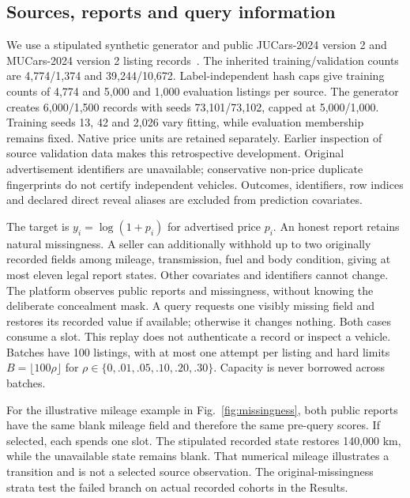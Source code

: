 \subsection{Sources, reports and query information}
\label{sec:source_query}
We use a stipulated synthetic generator and public JUCars-2024 version 2
and MUCars-2024 version 2 listing records~\cite{thalji2026jucars,tabarnoust2024mucars}.
The inherited training/validation counts are 4,774/1,374 and 39,244/10,672.
Label-independent hash caps give training counts of 4,774 and 5,000 and
1,000 evaluation listings per source. The generator creates 6,000/1,500
records with seeds 73,101/73,102, capped at 5,000/1,000. Training seeds
13, 42 and 2,026 vary fitting, while evaluation membership remains fixed.
Native price units are retained separately. Earlier inspection of source
validation data makes this retrospective development. Original advertisement
identifiers are unavailable; conservative non-price duplicate fingerprints
do not certify independent vehicles. Outcomes, identifiers, row indices and
declared direct reveal aliases are excluded from prediction covariates.

The target is $y_i=\log(1+p_i)$ for advertised price $p_i$. An honest report
retains natural missingness. A seller can additionally withhold up to two
originally recorded fields among mileage, transmission, fuel and body condition,
giving at most eleven legal report states. Other covariates and identifiers
cannot change. The platform observes public reports and missingness, without
knowing the deliberate concealment mask. A query requests one visibly missing
field and restores its recorded value if available; otherwise it changes
nothing. Both cases consume a slot. This replay does not authenticate a
record or inspect a vehicle. Batches have 100 listings, with at most one
attempt per listing and hard limits $B=\lfloor100\rho\rfloor$ for
$\rho\in\{0,.01,.05,.10,.20,.30\}$. Capacity is never borrowed across batches.

For the illustrative mileage example in Fig.~\ref{fig:missingness}, both
public reports have the same blank mileage field and therefore the same
pre-query scores. If selected, each spends one slot. The stipulated recorded
state restores 140,000 km, while the unavailable state remains blank.
That numerical mileage illustrates a transition and is not a selected source
observation. The original-missingness strata test the failed branch on actual
recorded cohorts in the Results.

